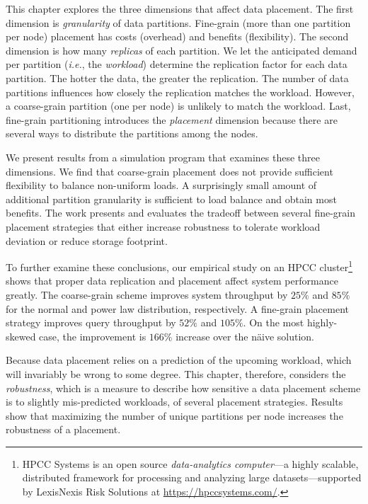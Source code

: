 This chapter explores the three dimensions that affect data placement.
The first dimension is \emph{granularity} of data partitions.
Fine-grain (more than one partition per node) placement has costs
(overhead) and benefits (flexibility).
The second dimension is how many \emph{replicas} of each partition.
We let the anticipated demand per partition (\emph{i.e.}, the
\emph{workload}) 
determine the replication factor for each data partition.
The hotter the data, the greater the replication.
The number of data partitions influences how closely the replication
matches the workload.
However,
a coarse-grain partition (one per node) is unlikely to match the
workload.
Last, fine-grain partitioning introduces the
\emph{placement} dimension because there are several ways to distribute
the partitions among the nodes.

We present results from a simulation program that
examines these three dimensions.
We find that coarse-grain placement does not provide sufficient
flexibility to balance non-uniform loads.
A surprisingly small amount of additional partition granularity
is sufficient to load balance and obtain most benefits.
The work presents and evaluates the tradeoff between several
fine-grain placement strategies that either
increase robustness to tolerate workload deviation or
reduce storage footprint.

To further examine these conclusions, our empirical study
on an HPCC cluster\footnote{HPCC Systems is an open source
  \emph{data-analytics computer}---a highly scalable, distributed
  framework for processing and analyzing
  large datasets---supported by LexisNexis Risk Solutions at
  \url{https://hpccsystems.com/}.
}
shows that proper data replication and placement
affect system performance greatly.
The coarse-grain scheme improves system throughput by
$25\%$ and $85\%$ for the normal and power law distribution,
respectively.
A fine-grain placement strategy 
improves query throughput by $52\%$ and $105\%$.
On the most highly-skewed case, the improvement is $166\%$ increase over the
n\"aive solution.

Because data placement relies on a prediction of the upcoming
workload, which will invariably be wrong to some degree.
This chapter, therefore, considers the \emph{robustness}, which
is a measure to describe how sensitive a data placement scheme is to
slightly mis-predicted workloads, of several placement strategies.
Results show that maximizing the number of unique partitions per node
increases the robustness of a placement.